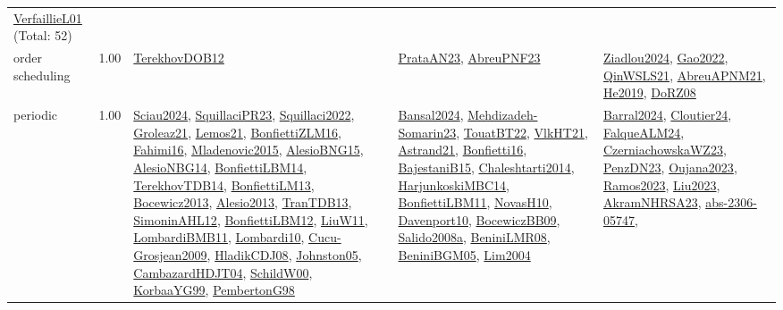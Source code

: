 {\begin{longtable}{p{3cm}r>{\raggedright\arraybackslash}p{6cm}>{\raggedright\arraybackslash}p{6cm}>{\raggedright\arraybackslash}p{8cm}}
\hyperref[detail:VerfaillieL01]{VerfaillieL01} (Total: 52)\\
\index{order scheduling}\index{Concepts!order scheduling}order scheduling &  1.00 & \hyperref[detail:TerekhovDOB12]{TerekhovDOB12} & \hyperref[detail:PrataAN23]{PrataAN23}, \hyperref[detail:AbreuPNF23]{AbreuPNF23} & \hyperref[detail:Ziadlou2024]{Ziadlou2024}, \hyperref[detail:Gao2022]{Gao2022}, \hyperref[detail:QinWSLS21]{QinWSLS21}, \hyperref[detail:AbreuAPNM21]{AbreuAPNM21}, \hyperref[detail:He2019]{He2019}, \hyperref[detail:DoRZ08]{DoRZ08}\\
\index{periodic}\index{Concepts!periodic}periodic &  1.00 & \hyperref[detail:Sciau2024]{Sciau2024}, \hyperref[detail:SquillaciPR23]{SquillaciPR23}, \hyperref[detail:Squillaci2022]{Squillaci2022}, \hyperref[detail:Groleaz21]{Groleaz21}, \hyperref[detail:Lemos21]{Lemos21}, \hyperref[detail:BonfiettiZLM16]{BonfiettiZLM16}, \hyperref[detail:Fahimi16]{Fahimi16}, \hyperref[detail:Mladenovic2015]{Mladenovic2015}, \hyperref[detail:AlesioBNG15]{AlesioBNG15}, \hyperref[detail:AlesioNBG14]{AlesioNBG14}, \hyperref[detail:BonfiettiLBM14]{BonfiettiLBM14}, \hyperref[detail:TerekhovTDB14]{TerekhovTDB14}, \hyperref[detail:BonfiettiLM13]{BonfiettiLM13}, \hyperref[detail:Bocewicz2013]{Bocewicz2013}, \hyperref[detail:Alesio2013]{Alesio2013}, \hyperref[detail:TranTDB13]{TranTDB13}, \hyperref[detail:SimoninAHL12]{SimoninAHL12}, \hyperref[detail:BonfiettiLBM12]{BonfiettiLBM12}, \hyperref[detail:LiuW11]{LiuW11}, \hyperref[detail:LombardiBMB11]{LombardiBMB11}, \hyperref[detail:Lombardi10]{Lombardi10}, \hyperref[detail:Cucu-Grosjean2009]{Cucu-Grosjean2009}, \hyperref[detail:HladikCDJ08]{HladikCDJ08}, \hyperref[detail:Johnston05]{Johnston05}, \hyperref[detail:CambazardHDJT04]{CambazardHDJT04}, \hyperref[detail:SchildW00]{SchildW00}, \hyperref[detail:KorbaaYG99]{KorbaaYG99}, \hyperref[detail:PembertonG98]{PembertonG98} & \hyperref[detail:Bansal2024]{Bansal2024}, \hyperref[detail:Mehdizadeh-Somarin23]{Mehdizadeh-Somarin23}, \hyperref[detail:TouatBT22]{TouatBT22}, \hyperref[detail:VlkHT21]{VlkHT21}, \hyperref[detail:Astrand21]{Astrand21}, \hyperref[detail:Bonfietti16]{Bonfietti16}, \hyperref[detail:BajestaniB15]{BajestaniB15}, \hyperref[detail:Chaleshtarti2014]{Chaleshtarti2014}, \hyperref[detail:HarjunkoskiMBC14]{HarjunkoskiMBC14}, \hyperref[detail:BonfiettiLBM11]{BonfiettiLBM11}, \hyperref[detail:NovasH10]{NovasH10}, \hyperref[detail:Davenport10]{Davenport10}, \hyperref[detail:BocewiczBB09]{BocewiczBB09}, \hyperref[detail:Salido2008a]{Salido2008a}, \hyperref[detail:BeniniLMR08]{BeniniLMR08}, \hyperref[detail:BeniniBGM05]{BeniniBGM05}, \hyperref[detail:Lim2004]{Lim2004} & \hyperref[detail:Barral2024]{Barral2024}, \hyperref[detail:Cloutier24]{Cloutier24}, \hyperref[detail:FalqueALM24]{FalqueALM24}, \hyperref[detail:CzerniachowskaWZ23]{CzerniachowskaWZ23}, \hyperref[detail:PenzDN23]{PenzDN23}, \hyperref[detail:Oujana2023]{Oujana2023}, \hyperref[detail:Ramos2023]{Ramos2023}, \hyperref[detail:Liu2023]{Liu2023}, \hyperref[detail:AkramNHRSA23]{AkramNHRSA23}, \hyperref[detail:abs-2306-05747]{abs-2306-05747}, 
\end{longtable}}
